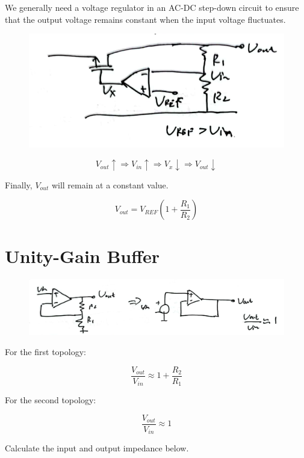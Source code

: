 \documentclass[fontset=windows]{article}
\begin{document}
We generally need a voltage regulator in an AC-DC step-down circuit to ensure that the output voltage remains constant when the input voltage fluctuates. 

\begin{figure}[htbp]
    \centering
    \includegraphics[scale=0.8]{10.jpg}
    \captionsetup{labelformat=empty}
    \caption{}
    \label{10}
\end{figure}

$$V_{out}\uparrow\Longrightarrow V_{in}\uparrow\Longrightarrow V_x\downarrow\Longrightarrow V_{out}\downarrow$$

Finally, $V_{out}$ will remain at a constant value. 

$$V_{out}=V_{REF}(1+\frac{R_1}{R_2})$$

\section*{Unity-Gain Buffer}

\begin{figure}[htbp]
    \centering
    \includegraphics[scale=0.8]{11.jpg}
    \captionsetup{labelformat=empty}
    \caption{}
    \label{11}
\end{figure}

For the first topology: 

$$\frac{V_{out}}{V_{in}}\approx 1+\frac{R_2}{R_1}$$

For the second topology: 

$$\frac{V_{out}}{V_{in}}\approx 1$$

Calculate the input and output impedance below. 
\end{document}
